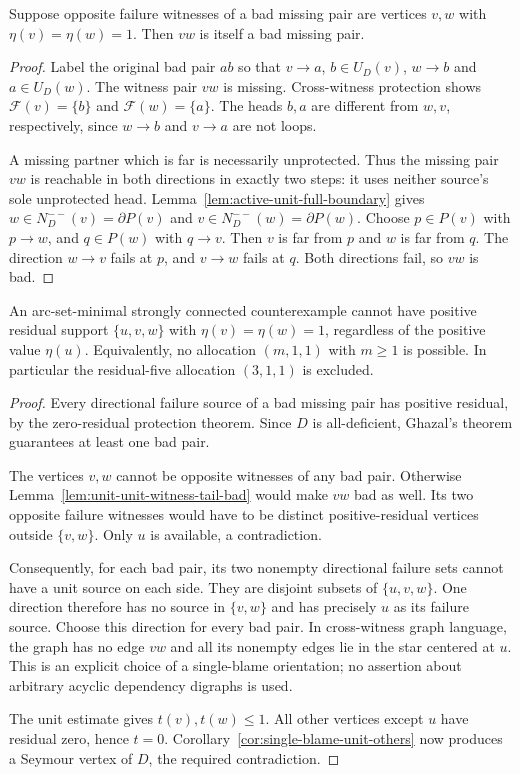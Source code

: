\begin{lemma}\label{lem:unit-unit-witness-tail-bad}
Suppose opposite failure witnesses of a bad missing pair are vertices
$v,w$ with $\eta(v)=\eta(w)=1$.
Then $vw$ is itself a bad missing pair.
\end{lemma}
\begin{proof}
Label the original bad pair $ab$ so that
$v\to a$, $b\in U_D(v)$, $w\to b$ and $a\in U_D(w)$.
The witness pair $vw$ is missing.
Cross-witness protection shows
$\mathcal F(v)=\{b\}$ and $\mathcal F(w)=\{a\}$.
The heads $b,a$ are different from $w,v$, respectively, since
$w\to b$ and $v\to a$ are not loops.

A missing partner which is far is necessarily unprotected.
Thus the missing pair $vw$ is reachable in both directions in
exactly two steps: it uses neither source's sole unprotected head.
Lemma~\ref{lem:active-unit-full-boundary} gives
$w\in N_D^{--}(v)=\partial P(v)$ and
$v\in N_D^{--}(w)=\partial P(w)$.
Choose $p\in P(v)$ with $p\to w$, and $q\in P(w)$ with $q\to v$.
Then $v$ is far from $p$ and $w$ is far from $q$.
The direction $w\to v$ fails at $p$, and $v\to w$ fails at $q$.
Both directions fail, so $vw$ is bad.
\end{proof}

\begin{theorem}\label{thm:three-positive-two-units}
An arc-set-minimal strongly connected counterexample cannot have
positive residual support $\{u,v,w\}$ with
$\eta(v)=\eta(w)=1$, regardless of the positive value $\eta(u)$.
Equivalently, no allocation $(m,1,1)$ with $m\ge1$ is possible.
In particular the residual-five allocation $(3,1,1)$ is excluded.
\end{theorem}
\begin{proof}
Every directional failure source of a bad missing pair has positive
residual, by the zero-residual protection theorem.
Since $D$ is all-deficient, Ghazal's theorem
\cite[Theorem~2]{Ghazal2012} guarantees at least one bad pair.

The vertices $v,w$ cannot be opposite witnesses of any bad pair.
Otherwise Lemma~\ref{lem:unit-unit-witness-tail-bad} would make $vw$
bad as well.  Its two opposite failure witnesses would have to be
distinct positive-residual vertices outside $\{v,w\}$.
Only $u$ is available, a contradiction.

Consequently, for each bad pair, its two nonempty directional failure
sets cannot have a unit source on each side.
They are disjoint subsets of $\{u,v,w\}$.
One direction therefore has no source in $\{v,w\}$ and has precisely
$u$ as its failure source.
Choose this direction for every bad pair.
In cross-witness graph language, the graph has no edge $vw$ and
all its nonempty edges lie in the star centered at $u$.
This is an explicit choice of a single-blame orientation; no assertion
about arbitrary acyclic dependency digraphs is used.

The unit estimate gives $t(v),t(w)\le1$.
All other vertices except $u$ have residual zero, hence $t=0$.
Corollary~\ref{cor:single-blame-unit-others} now produces a Seymour
vertex of $D$, the required contradiction.
\end{proof}

